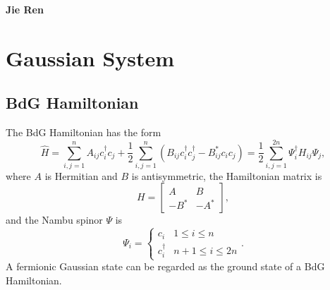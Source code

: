 \documentclass{SciPost}
\begin{document}
\pagestyle{SPstyle}

\begin{center}{\Large \textbf{\color{scipostdeepblue}{
Gaussian Stochastic Schr\"odinger Equation\\
}}}\end{center}

\begin{center}
\textbf{Jie Ren}
\end{center}

\tableofcontents

\section{Gaussian System}

\subsection{BdG Hamiltonian}
The BdG Hamiltonian has the form
\begin{equation}
	\hat H = \sum_{i,j=1}^n A_{ij} c_i^\dagger c_j+\frac{1}{2}\sum_{i,j=1}^n (B_{ij}c_i^\dagger c_j^\dagger-B_{ij}^*c_ic_j)=\frac{1}{2}\sum_{i,j=1}^{2n} \Psi_i^\dagger H_{ij} \Psi_j,
\end{equation}
where $A$ is Hermitian and $B$ is antisymmetric, the Hamiltonian matrix is
\begin{equation}
	H= \begin{bmatrix} A & B \\ -B^* & -A^* \end{bmatrix},
\end{equation}
and the Nambu spinor $\Psi$ is
\begin{equation}
	\Psi_i = \begin{cases}
		c_i & 1 \le i \le n \\
		c_i^\dagger & n+1 \le i \le 2n
	\end{cases}.
\end{equation} 
A fermionic Gaussian state can be regarded as the ground state of a BdG Hamiltonian.
\end{document}
